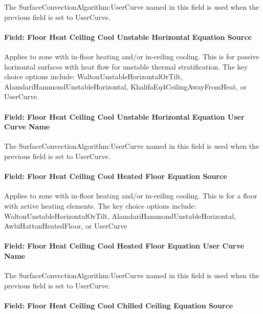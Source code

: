 The SurfaceConvectionAlgorithm:UserCurve named in this field is used when the previous field is set to UserCurve.

\paragraph{Field: Floor Heat Ceiling Cool Unstable Horizontal Equation Source}\label{field-floor-heat-ceiling-cool-unstable-horizontal-equation-source}

Applies to zone with in-floor heating and/or in-ceiling cooling. This is for passive horizontal surfaces with heat flow for unstable thermal stratification. The key choice options include: WaltonUnstableHorizontalOrTilt, AlamdariHammondUnstableHorizontal, KhalifaEq4CeilingAwayFromHeat, or UserCurve.

\paragraph{Field: Floor Heat Ceiling Cool Unstable Horizontal Equation User Curve Name}\label{field-floor-heat-ceiling-cool-unstable-horizontal-equation-user-curve-name}

The SurfaceConvectionAlgorithm:UserCurve named in this field is used when the previous field is set to UserCurve.

\paragraph{Field: Floor Heat Ceiling Cool Heated Floor Equation Source}\label{field-floor-heat-ceiling-cool-heated-floor-equation-source}

Applies to zone with in-floor heating and/or in-ceiling cooling. This is for a floor with active heating elements. The key choice options include: WaltonUnstableHorizontalOrTilt, AlamdariHammondUnstableHorizontal, AwbiHattonHeatedFloor, or UserCurve

\paragraph{Field: Floor Heat Ceiling Cool Heated Floor Equation User Curve Name}\label{field-floor-heat-ceiling-cool-heated-floor-equation-user-curve-name}

The SurfaceConvectionAlgorithm:UserCurve named in this field is used when the previous field is set to UserCurve.

\paragraph{Field: Floor Heat Ceiling Cool Chilled Ceiling Equation Source}\label{field-floor-heat-ceiling-cool-chilled-ceiling-equation-source}

